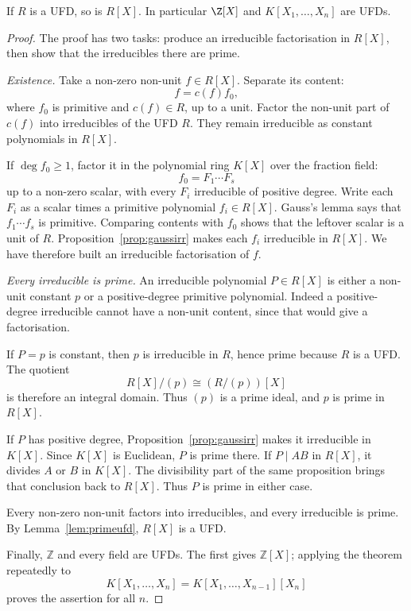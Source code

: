 \begin{theorem}[Gauss]\label{thm:gaussufd}
If $R$ is a UFD, so is $R[X]$. In particular $\Z[X]$ and $K[X_1,\dots,X_n]$ are UFDs.
\end{theorem}
\begin{proof}
The proof has two tasks: produce an
irreducible factorisation in $R[X]$,
then show that the irreducibles there
are prime.

\emph{Existence.}
Take a non-zero non-unit $f\in R[X]$.
Separate its content:
\[
f=c(f)f_0,
\]
where $f_0$ is primitive and
$c(f)\in R$, up to a unit.
Factor the non-unit part of $c(f)$
into irreducibles of the UFD $R$.
They remain irreducible as constant
polynomials in $R[X]$.

If $\deg f_0\ge1$, factor it in
the polynomial ring $K[X]$ over the
fraction field:
\[
f_0=F_1\cdots F_s
\]
up to a non-zero scalar, with every
$F_i$ irreducible of positive degree.
Write each $F_i$ as a scalar times
a primitive polynomial $f_i\in R[X]$.
Gauss's lemma says that
$f_1\cdots f_s$ is primitive.
Comparing contents with $f_0$
shows that the leftover scalar
is a unit of $R$.
Proposition~\ref{prop:gaussirr}
makes each $f_i$ irreducible in
$R[X]$. We have therefore built
an irreducible factorisation of $f$.

\emph{Every irreducible is prime.}
An irreducible polynomial $P\in R[X]$
is either a non-unit constant $p$
or a positive-degree primitive polynomial.
Indeed a positive-degree irreducible
cannot have a non-unit content,
since that would give a factorisation.

If $P=p$ is constant, then $p$
is irreducible in $R$, hence prime
because $R$ is a UFD. The quotient
\[
R[X]/(p)\cong(R/(p))[X]
\]
is therefore an integral domain.
Thus $(p)$ is a prime ideal,
and $p$ is prime in $R[X]$.

If $P$ has positive degree,
Proposition~\ref{prop:gaussirr}
makes it irreducible in $K[X]$.
Since $K[X]$ is Euclidean,
$P$ is prime there. If
$P\mid AB$ in $R[X]$, it divides
$A$ or $B$ in $K[X]$. The divisibility
part of the same proposition brings
that conclusion back to $R[X]$.
Thus $P$ is prime in either case.

Every non-zero non-unit factors
into irreducibles, and every
irreducible is prime. By
Lemma~\ref{lem:primeufd}, $R[X]$
is a UFD.

Finally, $\mathbb Z$ and every field
are UFDs. The first gives
$\mathbb Z[X]$; applying the theorem
repeatedly to
\[
K[X_1,\ldots,X_n]
=K[X_1,\ldots,X_{n-1}][X_n]
\]
proves the assertion for all $n$.
\end{proof}

